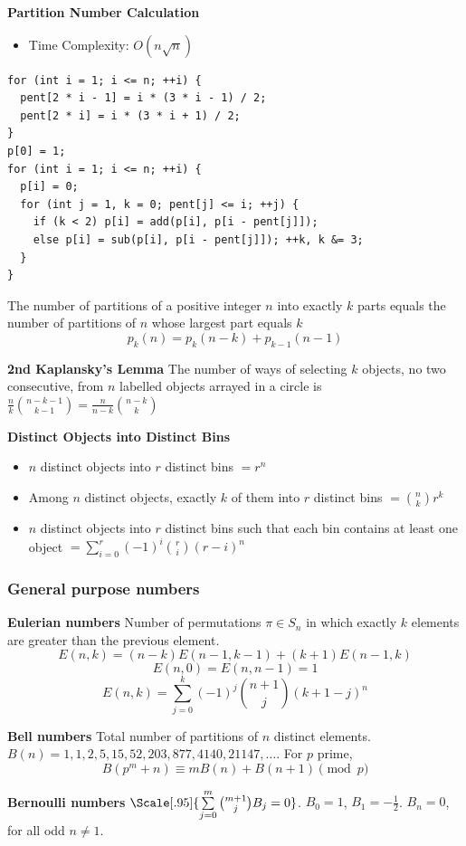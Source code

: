 \textbf{Partition Number Calculation}
\begin{itemize}
\item Time Complexity: $ O(n\sqrt{n}) $
\end{itemize}
\begin{verbatim}
for (int i = 1; i <= n; ++i) {
  pent[2 * i - 1] = i * (3 * i - 1) / 2;
  pent[2 * i] = i * (3 * i + 1) / 2;
}
p[0] = 1;
for (int i = 1; i <= n; ++i) {
  p[i] = 0;
  for (int j = 1, k = 0; pent[j] <= i; ++j) {
    if (k < 2) p[i] = add(p[i], p[i - pent[j]]);
    else p[i] = sub(p[i], p[i - pent[j]]); ++k, k &= 3;
  }
}
\end{verbatim}
The number of partitions of a positive integer \( n \) into exactly \( k \) parts equals the number of partitions of \( n \) whose largest part equals \( k \)
\[ p_k(n) = p_k(n - k) + p_{k - 1}(n - 1) \]

\textbf{2nd Kaplansky's Lemma}
The number of ways of selecting \( k \) objects, no two consecutive, from \( n \) labelled objects arrayed in a circle is \( \frac{n}{k} \binom{n-k-1}{k-1} = \frac{n}{n - k} \binom{n-k}{k} \)

\textbf{Distinct Objects into Distinct Bins}
\begin{itemize}
  \item $ n $ distinct objects into $ r $ distinct bins $ = r^n $
  \item Among $ n $ distinct objects, exactly $ k $ of them into $ r $ distinct bins $ = \binom{n}{k}r^k $
  \item $ n $ distinct objects into $ r $ distinct bins such that each bin contains at least one object $ = \sum_{i = 0}^{r} (-1)^i \binom{r}{i} (r - i)^n $
\end{itemize}

\subsubsection{General purpose numbers}
\textbf{Eulerian numbers}
Number of permutations $\pi \in S_n$ in which exactly $k$ elements are greater than the previous element.
$$E(n,k) = (n-k)E(n-1,k-1) + (k+1)E(n-1,k)$$
$$E(n,0) = E(n,n-1) = 1$$
$$E(n,k) = \sum_{j=0}^k(-1)^j\binom{n+1}{j}(k+1-j)^n$$

\textbf{Bell numbers}
Total number of partitions of $n$ distinct elements. $B(n) = 1, 1, 2, 5, 15, 52, 203, 877, 4140, 21147, \dots$. For $p$ prime,
\[ B(p^m+n)\equiv mB(n)+B(n+1) \pmod{p} \]

\textbf{Bernoulli numbers}
$\Scale[.95]{\sum\limits_{j=0}^m \binom{m+1}{j} B_j = 0}$.
\quad $B_0=1$, $B_1=-\frac{1}{2}$. $B_n=0$, for all odd $n \ne 1$.

